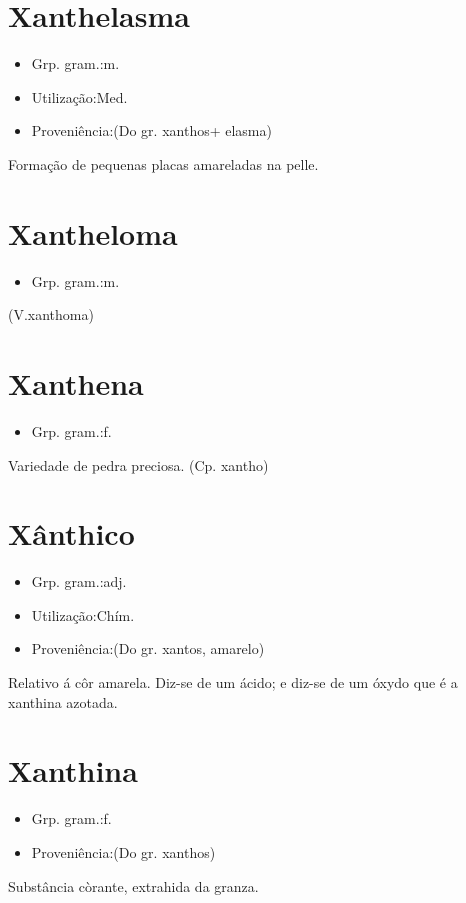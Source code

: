 \section{Xanthelasma}
\begin{itemize}
\item {Grp. gram.:m.}
\end{itemize}
\begin{itemize}
\item {Utilização:Med.}
\end{itemize}
\begin{itemize}
\item {Proveniência:(Do gr. \textunderscore xanthos\textunderscore  + \textunderscore elasma\textunderscore )}
\end{itemize}
Formação de pequenas placas amareladas na pelle.
\section{Xantheloma}
\begin{itemize}
\item {Grp. gram.:m.}
\end{itemize}
(V.xanthoma)
\section{Xanthena}
\begin{itemize}
\item {Grp. gram.:f.}
\end{itemize}
Variedade de pedra preciosa.
(Cp. \textunderscore xantho\textunderscore )
\section{Xânthico}
\begin{itemize}
\item {Grp. gram.:adj.}
\end{itemize}
\begin{itemize}
\item {Utilização:Chím.}
\end{itemize}
\begin{itemize}
\item {Proveniência:(Do gr. \textunderscore xantos\textunderscore , amarelo)}
\end{itemize}
Relativo á côr amarela.
Diz-se de um ácido; e diz-se de um óxydo que é a xanthina azotada.
\section{Xanthina}
\begin{itemize}
\item {Grp. gram.:f.}
\end{itemize}
\begin{itemize}
\item {Proveniência:(Do gr. \textunderscore xanthos\textunderscore )}
\end{itemize}
Substância còrante, extrahida da granza.

